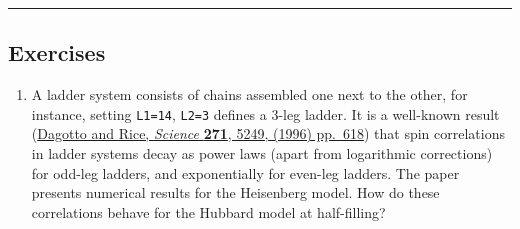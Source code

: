     \begin{center}\rule{0.5\linewidth}{0.5pt}\end{center}

\hypertarget{exercises}{%
\subsection{Exercises}\label{exercises}}

\begin{enumerate}
\def\labelenumi{\arabic{enumi}.}
\tightlist
\item
  A ladder system consists of chains assembled one next to the other,
  for instance, setting \texttt{L1=14}, \texttt{L2=3} defines a 3-leg
  ladder. It is a well-known result
  (\href{https://doi.org/10.1126/science.271.5249.618}{Dagotto and Rice,
  \emph{Science} \textbf{271}, 5249, (1996) pp.~618}) that spin
  correlations in ladder systems decay as power laws (apart from
  logarithmic corrections) for odd-leg ladders, and exponentially for
  even-leg ladders. The paper presents numerical results for the
  Heisenberg model. How do these correlations behave for the Hubbard
  model at half-filling?
\end{enumerate}


    
    
    
